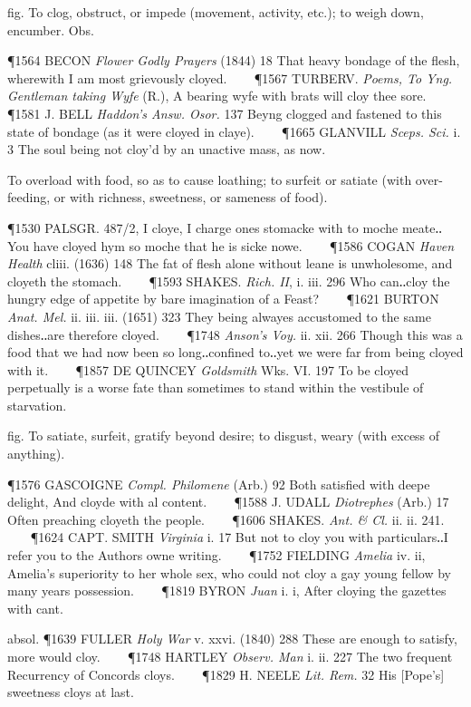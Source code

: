 \begin{description}[wide, labelwidth=!, labelindent=0pt]
\begin{myenumerate}
 fig. To clog, obstruct, or impede (movement, activity, etc.); to weigh down, encumber. Obs.

\P 1564 BECON  \textit{Flower Godly Prayers} (1844) 18 That heavy bondage of the flesh, wherewith I am most grievously cloyed.    
\P 1567 TURBERV.  \textit{Poems, To Yng. Gentleman taking Wyfe} (R.), A bearing wyfe with brats will cloy thee sore.    
\P 1581 J. BELL  \textit{Haddon's Answ. Osor.} 137 Beyng clogged and fastened to this state of bondage (as it were cloyed in claye).    
\P 1665 GLANVILL  \textit{Sceps. Sci.} i. 3 The soul being not cloy'd by an unactive mass, as now.

 To overload with food, so as to cause loathing; to surfeit or satiate (with over-feeding, or with richness, sweetness, or sameness of food).

\P 1530 PALSGR. 487/2, I cloye, I charge ones stomacke with to moche meate‥You have cloyed hym so moche that he is sicke nowe.    
\P 1586 COGAN  \textit{Haven Health} cliii. (1636) 148 The fat of flesh alone without leane is unwholesome, and cloyeth the stomach.    
\P 1593 SHAKES.  \textit{Rich. II}, i. iii. 296 Who can‥cloy the hungry edge of appetite by bare imagination of a Feast?    
\P 1621 BURTON  \textit{Anat. Mel.} ii. iii. iii. (1651) 323 They being alwayes accustomed to the same dishes‥are therefore cloyed.    
\P 1748 \textit{Anson's  Voy.} ii. xii. 266 Though this was a food that we had now been so long‥confined to‥yet we were far from being cloyed with it.    
\P 1857 DE QUINCEY  \textit{Goldsmith} Wks. VI. 197 To be cloyed perpetually is a worse fate than sometimes to stand within the vestibule of starvation.

 fig. To satiate, surfeit, gratify beyond desire; to disgust, weary (with excess of anything).

\P 1576 GASCOIGNE  \textit{Compl. Philomene} (Arb.) 92 Both satisfied with deepe delight, And cloyde with al content.    
\P 1588 J. UDALL  \textit{Diotrephes} (Arb.) 17 Often preaching cloyeth the people.    
\P 1606 SHAKES.  \textit{Ant. \& Cl.} ii. ii. 241.    
\P 1624 CAPT. SMITH  \textit{Virginia} i. 17 But not to cloy you with particulars‥I refer you to the Authors owne writing.    
\P 1752 FIELDING  \textit{Amelia} iv. ii, Amelia's superiority to her whole sex, who could not cloy a gay young fellow by many years possession.    
\P 1819 BYRON  \textit{Juan} i. i, After cloying the gazettes with cant.

absol. \P 1639 FULLER  \textit{Holy War} v. xxvi. (1840) 288 These are enough to satisfy, more would cloy.    
\P 1748 HARTLEY  \textit{Observ. Man} i. ii. 227 The two frequent Recurrency of Concords cloys.    
\P 1829 H. NEELE  \textit{Lit. Rem.} 32 His [Pope's] sweetness cloys at last.


\end{myenumerate}
\end{description}
